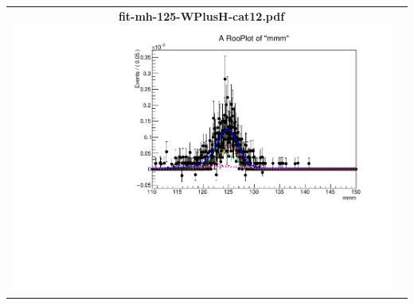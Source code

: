 \begin{longtable}{|c|c|}
{}
 \\
\hline
\parbox{0.49\textwidth}{
\centering
{\bfseries fit-mh-125-WPlusH-cat12.pdf}
\includegraphics[width=.49\textwidth]{figures/signal_model/AppendixBdt/WPlusH/125/fit_mh_125_WPlusH_cat12.pdf}
}
 & \\ \hline
\end{longtable}
